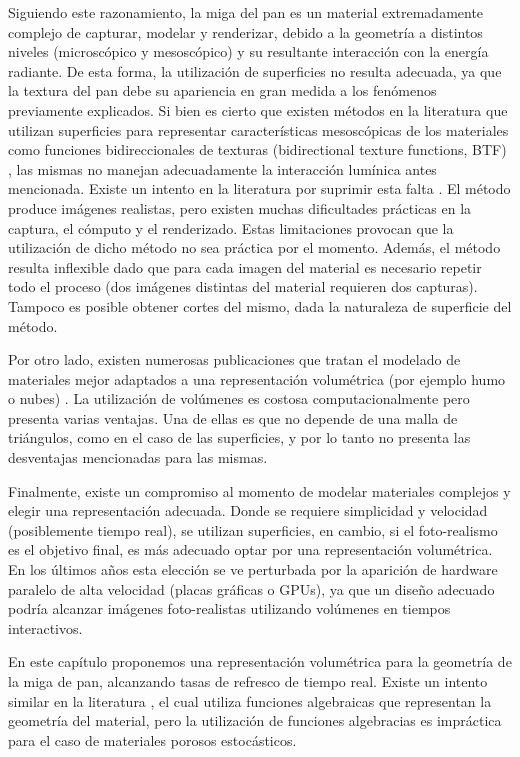 Siguiendo este razonamiento, la miga del pan es un material extremadamente complejo de capturar, modelar y renderizar, debido a la geometría a distintos niveles (microscópico y mesoscópico) y su resultante interacción con la energía radiante.
De esta forma, la utilización de superficies no resulta adecuada, ya que la textura del pan debe su apariencia en gran medida a los fenómenos previamente explicados.
Si bien es cierto que existen métodos en la literatura que utilizan superficies para representar características mesoscópicas de los materiales como funciones bidireccionales de texturas (bidirectional texture functions, \acrshort{BTF}) \cite{Tong2002}, las mismas no manejan adecuadamente la interacción lumínica antes mencionada.
Existe un intento en la literatura por suprimir esta falta \cite{Tong2005}.
El método produce imágenes realistas, pero existen muchas dificultades prácticas en la captura, el cómputo y el renderizado.
Estas limitaciones provocan que la utilización de dicho método no sea práctica por el momento.
Además, el método resulta inflexible dado que para cada imagen del material es necesario repetir todo el proceso (dos imágenes distintas del material requieren dos capturas).
Tampoco es posible obtener cortes del mismo, dada la naturaleza de superficie del método.

Por otro lado, existen numerosas publicaciones que tratan el modelado de materiales mejor adaptados a una representación volumétrica (por ejemplo humo o nubes) \cite{Chentanez2011,Zhou2008}.
La utilización de volúmenes es costosa computacionalmente pero presenta varias ventajas. Una de ellas es que no depende de una malla de triángulos, como en el caso de las superficies, y por lo tanto no presenta las desventajas mencionadas para las mismas.

Finalmente, existe un compromiso al momento de modelar materiales complejos y elegir una representación adecuada.
Donde se requiere simplicidad y velocidad (posiblemente tiempo real), se utilizan superficies, en cambio, si el foto-realismo es el objetivo final, es más adecuado optar por una representación volumétrica.
En los últimos años esta elección se ve perturbada por la aparición de hardware paralelo de alta velocidad (placas gráficas o GPUs), ya que un diseño adecuado podría alcanzar imágenes foto-realistas utilizando volúmenes en tiempos interactivos.


En este capítulo proponemos una representación volumétrica para la geometría de la miga de pan, alcanzando tasas de refresco de tiempo real.
Existe un intento similar en la literatura \cite{Perlin1989}, el cual utiliza funciones algebraicas que representan la geometría del material, pero la utilización de funciones algebracias es impráctica para el caso de materiales porosos estocásticos.

